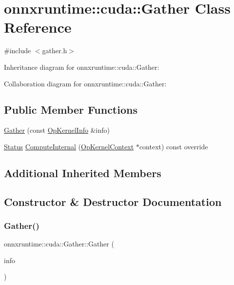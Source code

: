 \hypertarget{classonnxruntime_1_1cuda_1_1Gather}{}\section{onnxruntime\+:\+:cuda\+:\+:Gather Class Reference}
\label{classonnxruntime_1_1cuda_1_1Gather}


{\ttfamily \#include $<$gather.\+h$>$}



Inheritance diagram for onnxruntime\+:\+:cuda\+:\+:Gather\+:


Collaboration diagram for onnxruntime\+:\+:cuda\+:\+:Gather\+:
\subsection*{Public Member Functions}
\begin{DoxyCompactItemize}
\item 
\mbox{\hyperlink{classonnxruntime_1_1cuda_1_1Gather_a50174a127f0502cb30a07fdcadcc48ec}{Gather}} (const \mbox{\hyperlink{classonnxruntime_1_1OpKernelInfo}{Op\+Kernel\+Info}} \&info)
\item 
\mbox{\hyperlink{classonnxruntime_1_1common_1_1Status}{Status}} \mbox{\hyperlink{classonnxruntime_1_1cuda_1_1Gather_a515b0ccbd69b82dc830ed1b1f0dadfe2}{Compute\+Internal}} (\mbox{\hyperlink{classonnxruntime_1_1OpKernelContext}{Op\+Kernel\+Context}} $\ast$context) const override
\end{DoxyCompactItemize}
\subsection*{Additional Inherited Members}


\subsection{Constructor \& Destructor Documentation}
\mbox{\label{classonnxruntime_1_1cuda_1_1Gather_a50174a127f0502cb30a07fdcadcc48ec}} 
\subsubsection{\texorpdfstring{Gather()}{Gather()}}
{\footnotesize\ttfamily onnxruntime\+::cuda\+::\+Gather\+::\+Gather (\begin{DoxyParamCaption}\item[{const \mbox{\hyperlink{classonnxruntime_1_1OpKernelInfo}{Op\+Kernel\+Info}} \&}]{info }\end{DoxyParamCaption})\hspace{0.3cm}{\ttfamily [inline]}}



